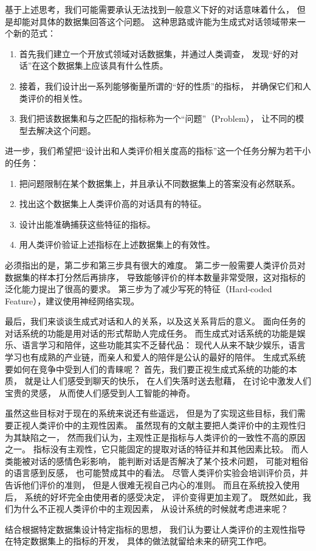 基于上述思考，我们可能需要承认无法找到一般意义下好的对话意味着什么，
但是却能对具体的数据集回答这个问题。
这种思路或许能为生成式对话领域带来一个新的范式：
\begin{enumerate}
    \item 首先我们建立一个开放式领域对话数据集，并通过人类调查，
    发现“好的对话”在这个数据集上应该具有什么性质。
    \item 接着，我们设计出一系列能够衡量所谓的“好的性质”的指标，
    并确保它们和人类评价的相关性。
    \item 我们把该数据集和与之匹配的指标称为一个“问题”（Problem），
    让不同的模型去解决这个问题。
\end{enumerate}
进一步，我们希望把“设计出和人类评价相关度高的指标”这一个任务分解为若干小的任务：
\begin{enumerate}
    \item 把问题限制在某个数据集上，并且承认不同数据集上的答案没有必然联系。
    \item 找出这个数据集上人类评价高的对话具有的特征。
    \item 设计出能准确捕获这些特征的指标。
    \item 用人类评价验证上述指标在上述数据集上的有效性。
\end{enumerate}

必须指出的是，第二步和第三步具有很大的难度。
第二步一般需要人类评价员对数据集的样本打分然后再排序，
导致能够评价的样本数量非常受限，这对指标的泛化能力提出了很高的要求。
第三步为了减少写死的特征（Hard-coded Feature），建议使用神经网络实现。

最后，我们来谈谈生成式对话和人的关系，以及这关系背后的意义。
面向任务的对话系统的功能是用对话的形式帮助人完成任务。
而生成式对话系统的功能是娱乐、语言学习和陪伴，这些功能其实不乏替代品：
现代人从来不缺少娱乐，语言学习也有成熟的产业链，而亲人和爱人的陪伴是公认的最好的陪伴。
生成式系统要如何在竞争中受到人们的青睐呢？
首先，我们要正视生成式系统的功能的本质，
就是让人们感受到聊天的快乐，
在人们失落时送去慰藉，
在讨论中激发人们宝贵的灵感，
从而使人们感受到人工智能的神奇。

虽然这些目标对于现在的系统来说还有些遥远，
但是为了实现这些目标，我们需要正视人类评价中的主观性因素。
虽然现有的文献主要把人类评价中的主观性归为其缺陷之一，
然而我们认为，主观性正是指标与人类评价的一致性不高的原因之一。
指标没有主观性，它只能固定的提取对话的特征并和其他因素比较。
而人类能被对话的感情色彩影响，
能判断对话是否解决了某个技术问题，
可能对粗俗的语言感到反感，
也可能赞成其中的看法。
尽管人类评价实验会培训评价员，并告诉他们评价的准则，
但是人很难无视自己内心的准则。
而且在系统投入使用后，
系统的好坏完全由使用者的感受决定，
评价变得更加主观了。
既然如此，我们为什么不正视人类评价中的主观因素，
从设计系统的时候就考虑进来呢？

结合根据特定数据集设计特定指标的思想，
我们认为要让人类评价的主观性指导在特定数据集上的指标的开发，
具体的做法就留给未来的研究工作吧。
